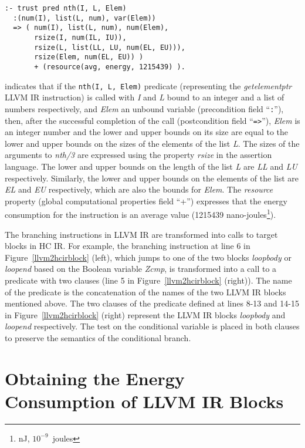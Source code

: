 \documentclass{llncs}
\newcommand{\hcir}{HC IR\xspace}
\newcommand{\llvmir}{LLVM IR\xspace}
\begin{document}
\begin{lstlisting}[language=ciao, basicstyle=\scriptsize\ttfamily,]
:- trust pred nth(I, L, Elem)
  :(num(I), list(L, num), var(Elem)) 
  => ( num(I), list(L, num), num(Elem), 
       rsize(I, num(IL, IU)), 
       rsize(L, list(LL, LU, num(EL, EU))), 
       rsize(Elem, num(EL, EU)) )
       + (resource(avg, energy, 1215439) ).
\end{lstlisting}

\noindent 
\noindent
indicates that if the \texttt{nth(I, L, Elem)} predicate (representing
the \textit{getelementptr} \llvmir instruction) is called with
\textit{I} and \textit{L} bound to an integer and a list of numbers respectively,
and \textit{Elem} an unbound variable (precondition field
``\texttt{:}''), then, after the successful completion of the call
(postcondition field ``\texttt{=>}''), \textit{Elem} is an integer
number and the lower and upper bounds on its size are equal to the
lower and upper bounds on the sizes of the elements of the list
\textit{L}. The sizes of the arguments to \textit{nth/3} are expressed
using the property \textit{rsize} in the assertion language. The lower
and upper bounds on the length of the list \textit{L} are \textit{LL}
and \textit{LU} respectively. Similarly, the lower and upper bounds on
the elements of the list are \textit{EL} and \textit{EU} respectively,
which are also the bounds for \textit{Elem}. The
\textit{resource} property (global computational properties field “+”)
expresses that the energy consumption for the instruction
is an average value (1215439 nano-joules\footnote{nJ, $10^{-9}$~joules}).

The branching instructions in \llvmir{} are transformed into calls to target blocks in \hcir{}. For example, the branching instruction at line 6 in Figure~\ref{llvm2hcirblock} (left),
which jumps to one of the two blocks \textit{loopbody} or
\textit{loopend} based on the Boolean variable \textit{Zcmp}, is
transformed into a call to a predicate with two clauses (line 5 in Figure~\ref{llvm2hcirblock} (right)). The name of
the predicate is the concatenation of the names of the two \llvmir
blocks mentioned above. The two clauses of the predicate defined at lines 8-13 and 14-15 in
Figure~\ref{llvm2hcirblock} (right) represent the \llvmir blocks
\textit{loopbody} and \textit{loopend} respectively. The test on the
conditional variable is placed in both clauses to preserve the 
semantics of the conditional branch.

\section{Obtaining the Energy Consumption of \llvmir Blocks}
\label{sec:energy-model}
\end{document}
